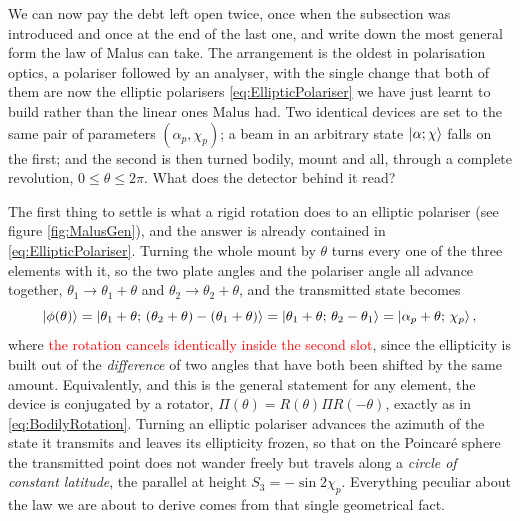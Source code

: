             We can now pay the debt left open twice, once when the subsection was introduced and once at the end of the last one, and write down the most general form the law of Malus can take. The arrangement is the oldest in polarisation optics, a polariser followed by an analyser, with the single change that both of them are now the elliptic polarisers \ref{eq:EllipticPolariser} we have just learnt to build rather than the linear ones Malus had. Two identical devices are set to the same pair of parameters $\left(\alpha_p,\chi_p\right)$; a beam in an arbitrary state $\ket{\alpha;\chi}$ falls on the first; and the second is then turned bodily, mount and all, through a complete revolution, $0\leq\theta\leq2\pi$. What does the detector behind it read?

            The first thing to settle is what a rigid rotation does to an elliptic polariser (see figure \ref{fig:MalusGen}), and the answer is already contained in \ref{eq:EllipticPolariser}. Turning the whole mount by $\theta$ turns every one of the three elements with it, so the two plate angles and the polariser angle all advance together, $\theta_1\to\theta_1+\theta$ and $\theta_2\to\theta_2+\theta$, and the transmitted state becomes
            \begin{equation}\label{eq:RotatedEllipticPolariser}
                \ket{\phi(\theta)} = \ket{\theta_1+\theta;\,\left(\theta_2+\theta\right)-\left(\theta_1+\theta\right)} = \ket{\theta_1+\theta;\,\theta_2-\theta_1} = \ket{\alpha_p+\theta;\,\chi_p} ,
            \end{equation}
            where \textcolor{red}{the rotation cancels identically inside the second slot}, since the ellipticity is built out of the \textit{difference} of two angles that have both been shifted by the same amount. Equivalently, and this is the general statement for any element, the device is conjugated by a rotator, $\Pi(\theta)=R(\theta)\Pi R(-\theta)$, exactly as in \ref{eq:BodilyRotation}. Turning an elliptic polariser advances the azimuth of the state it transmits and leaves its ellipticity frozen, so that on the Poincaré sphere the transmitted point does not wander freely but travels along a \textit{circle of constant latitude}, the parallel at height $S_3=-\sin2\chi_p$. Everything peculiar about the law we are about to derive comes from that single geometrical fact.

